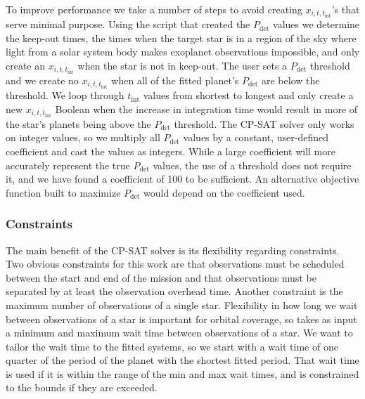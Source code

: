 To improve performance we take a number of steps to avoid creating $x_{i, t,
t_{\textrm{int}}}$'s that serve minimal purpose. Using the 
script that created the $P_{\textrm{det}}$ values we determine the keep-out
times, the times when the target star is in a region of the sky where light
from a solar system body makes exoplanet observations impossible, and only
create an $x_{i, t, t_{\textrm{int}}}$ when the star is not in keep-out. The
user sets a $P_{\textrm{det}}$ threshold and we create no $x_{i, t,
t_{\textrm{int}}}$ when all of the fitted planet's $P_{\textrm{det}}$ are below
the threshold. We loop through $t_{\textrm{int}}$ values from shortest to
longest and only create a new $x_{i, t, t_{\textrm{int}}}$ Boolean when the
increase in integration time would result in more of the star's planets being
above the $P_{\textrm{det}}$ threshold. The CP-SAT
solver only works on integer values, so we multiply all $P_{\textrm{det}}$
values by a constant, user-defined coefficient and cast the values as integers.
While a large coefficient will more accurately represent the true
$P_{\textrm{det}}$ values, the use of a threshold does not require it, and we
have found a coefficient of 100 to be sufficient. An alternative objective
function built to maximize $P_{\textrm{det}}$ would depend on the coefficient
used.

\subsubsection{Constraints}

The main benefit of the CP-SAT solver is its flexibility regarding constraints.
Two obvious constraints for this work are that observations must be scheduled
between the start and end of the mission and that observations must be
separated by at least the observation overhead time. Another constraint is the
maximum number of observations of a single star. Flexibility in how long we
wait between observations of a star is important for orbital coverage, so
 takes as input a minimum and maximum wait time between observations
of a star. We want to tailor the wait time to the fitted systems, so we start
with a wait time of one quarter of the period of the planet with the shortest
fitted period. That wait time is used if it is within the range of the min and
max wait times, and is constrained to the bounds if they are exceeded.

